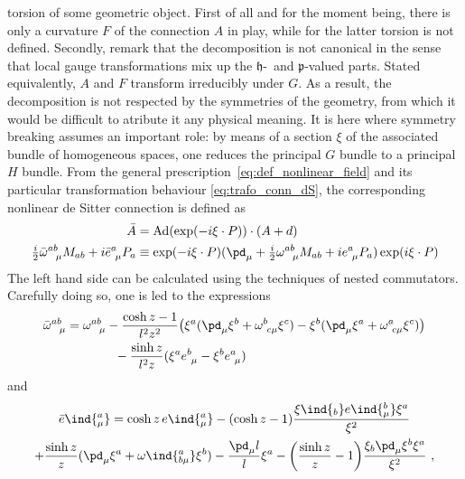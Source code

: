 \documentclass[11pt]{article}
\begin{document}
torsion of some geometric object. First of all and for the moment 
being, there is only a curvature $F$ of the connection $A$ in 
play, while for the latter torsion is not defined. Secondly, 
remark that the decomposition is not canonical in the sense that 
local gauge transformations mix up the $\mathfrak{h}$-~and 
$\mathfrak{p}$-valued parts.  Stated equivalently, $A$ and $F$ 
transform irreducibly under $G$. As a result, the decomposition 
is not respected by the symmetries of the geometry, from which it 
would be difficult to atribute it any physical meaning. It is 
here where symmetry breaking assumes an important role: by means 
of a section $\xi$ of the associated bundle of homogeneous 
spaces, one reduces the principal $G$ bundle to a principal $H$ 
bundle.  From the general 
prescription~\eqref{eq:def_nonlinear_field} and its particular 
transformation behaviour \eqref{eq:trafo_conn_dS}, the 
corresponding nonlinear de Sitter connection is defined as
%
\begin{equation}
	\label{eq:def_A_bar}
\begin{split}
	\bar{A} &= \mathrm{Ad}(\exp(-i\xi\cdot P))\cdot(A + d) \\
	\tfrac{i}{2}\bar{\omega}^{ab}_{~~\mu}M_{ab} + 
	i\bar{e}^a_{~\mu} P_a
	&\equiv \exp(-i\xi\cdot P)(\pd_\mu +
	\tfrac{i}{2}\omega^{ab}_{~~\mu}M_{ab} + ie^a_{~\mu} P_a) 
	\exp(i\xi\cdot P)
\end{split}
\end{equation}
The left hand side can be calculated using the techniques of 
nested commutators. Carefully doing so, one is led to the 
expressions
%
\begin{equation}
	\label{eq:nonlin_spinconn}
\begin{split}
	\bar{\omega}^{ab}_{~~\mu} = \omega^{ab}_{~~\mu} &- \frac{\cosh 
		z - 1}{l^2 z^2} \big(\xi^a (\pd_\mu \xi^b + 
	\omega^b_{~c\mu}\xi^c) - \xi^b (\pd_\mu \xi^a + 
	\omega^a_{~c\mu}\xi^c) \big) \\
	&~~- \frac{\sinh z}{l^2 z} (\xi^a e^b_{~\mu} - \xi^b 
	e^a_{~\mu})
\end{split}
\end{equation}
and
\begin{multline}
	\label{eq:nonlin_vierbein}
	\bar{e}\ind{^a_\mu} = \cosh z\, e\ind{^a_\mu} - (\cosh z - 1) 
	\frac{\xi\ind{_b} e\ind{^b_\mu} \xi^a}{\xi^2}
	\\
	+ \frac{\sinh z}{z}(\pd_\mu\xi^a + \omega\ind{^a_{b\mu}}\xi^b) 
	- \frac{\pd_\mu l}{l} \xi^a - \bigg( \frac{\sinh z}{z} - 1 
	\bigg) \frac{\xi_b \pd_\mu \xi^b \xi^a}{\xi^2}~,
\end{multline}
\end{document}

